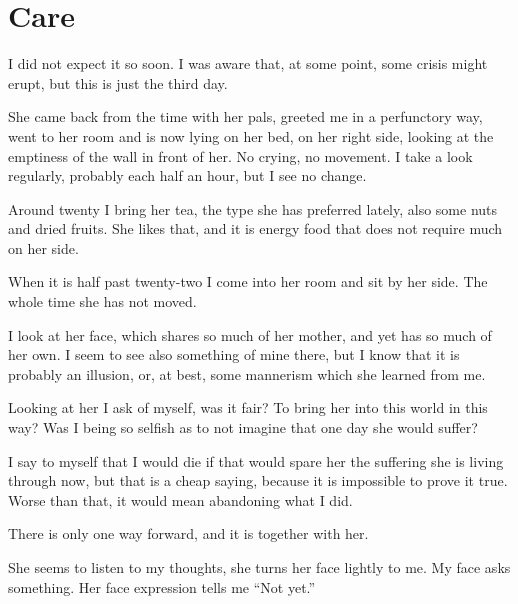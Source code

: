 \chapter*{Care}\label{care}

I did not expect it so soon. I was aware that, at some point, some crisis might erupt, but this is just the third day.

She came back from the time with her pals, greeted me in a perfunctory way, went to her room and is now lying on her bed, on her right side, looking at the emptiness of the wall in front of her. No crying, no movement. I take a look regularly, probably each half an hour, but I see no change.

Around twenty I bring her tea, the type she has preferred lately, also some nuts and dried fruits. She likes that, and it is energy food that does not require much on her side.  

When it is half past twenty-two I come into her room and sit by her side. The whole time she has not moved. 

I look at her face, which shares so much of her mother, and yet has so much of her own. I seem to see also something of mine there, but I know that it is probably an illusion, or, at best, some mannerism which she learned from me. 

Looking at her I ask of myself, was it fair? To bring her into this world in this way? Was I being so selfish as to not imagine that one day she would suffer?

I say to myself that I would die if that would spare her the suffering she is living through now, but that is a cheap saying, because it is impossible to prove it true. Worse than that, it would mean abandoning what I did.

There is only one way forward, and it is together with her. 

She seems to listen to my thoughts, she turns her face lightly to me. My face asks something. Her face expression tells me \enquote{Not yet.} 